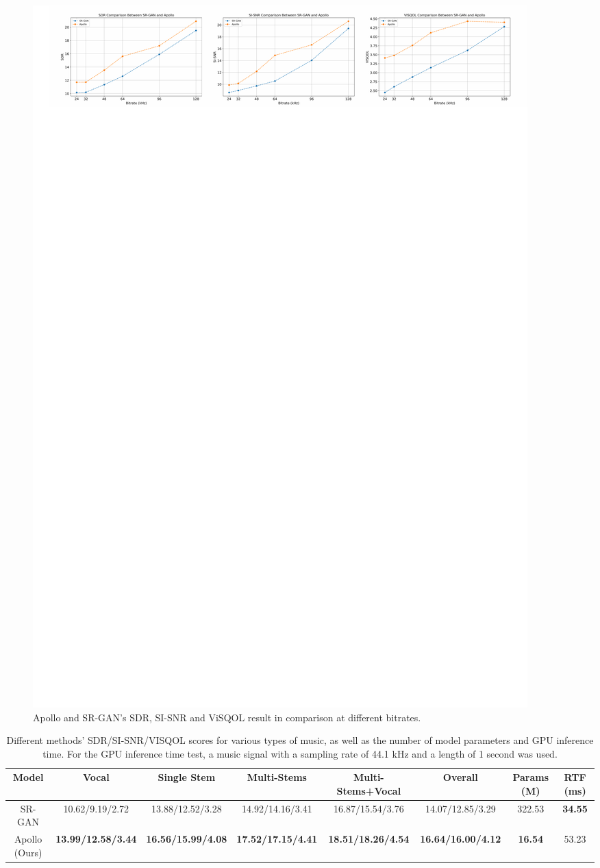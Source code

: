 \begin{figure}[h]
	\small
	\centering
	\includegraphics[width=2.0\columnwidth]{Figures/plot.pdf}
	\caption{Apollo and SR-GAN's SDR, SI-SNR and ViSQOL result in comparison at different bitrates.}
	\label{fig:plot}
\end{figure}

\begin{table}[]
\footnotesize
\centering
\caption{Different methods' SDR/SI-SNR/VISQOL scores for various types of music, as well as the number of model parameters and GPU inference time. For the GPU inference time test, a music signal with a sampling rate of 44.1 kHz and a length of 1 second was used.}
\begin{tabular}{cccccccc}
\toprule
Model  & Vocal            & Single Stem      & Multi-Stems      & Multi-Stems+Vocal & Overall   & Params (M) & RTF (ms)      \\ \midrule
SR-GAN \cite{lattner2021stochastic} & 10.62/9.19/2.72  & 13.88/12.52/3.28 & 14.92/14.16/3.41 & 16.87/15.54/3.76  & 14.07/12.85/3.29 & 322.53 & \textbf{34.55}\\
Apollo (Ours) & \textbf{13.99/12.58/3.44} & \textbf{16.56/15.99/4.08} & \textbf{17.52/17.15/4.41} & \textbf{18.51/18.26/4.54}  & \textbf{16.64/16.00/4.12} & \textbf{16.54} & 53.23 \\ \bottomrule
\end{tabular}
\label{tab:stems}
\vspace{-10pt}
\end{table}

